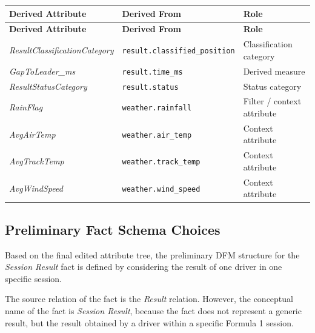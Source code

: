 \documentclass[a4paper,11pt]{article}
\begin{document}
	\begin{longtable}{|p{4.8cm}|p{5.4cm}|p{5.5cm}|}
		\hline
		\textbf{Derived Attribute} & \textbf{Derived From}  & \textbf{Role} \\
		\hline
		\endfirsthead
		
		\hline
		\textbf{Derived Attribute} & \textbf{Derived From}  & \textbf{Role} \\
		\hline
		\endhead
		
		\textit{ResultClassificationCategory}
		& \texttt{result.classified\_position}
		& Classification category \\
		\hline
		
		\textit{GapToLeader\_ms}
		& \texttt{result.time\_ms}
		& Derived measure \\
		\hline
		
		\textit{ResultStatusCategory}
		& \texttt{result.status}
		& Status category \\
		\hline
		
		\textit{RainFlag}
		& \texttt{weather.rainfall}
		& Filter / context attribute \\
		\hline
		
		\textit{AvgAirTemp}
		& \texttt{weather.air\_temp}
		& Context attribute \\
		\hline
		
		\textit{AvgTrackTemp}
		& \texttt{weather.track\_temp}
		& Context attribute \\
		\hline
		
		\textit{AvgWindSpeed}
		& \texttt{weather.wind\_speed}
		& Context attribute \\
		\hline
	\end{longtable}
	
	
	\subsection{Preliminary Fact Schema Choices}
	
	Based on the final edited attribute tree, the preliminary DFM structure for the
	\textit{Session Result} fact is defined by considering the result of one driver in one
	specific session.
	
	The source relation of the fact is the \textit{Result} relation. However, the conceptual
	name of the fact is \textit{Session Result}, because the fact does not represent a generic
	result, but the result obtained by a driver within a specific Formula 1 session.
	
\end{document}
